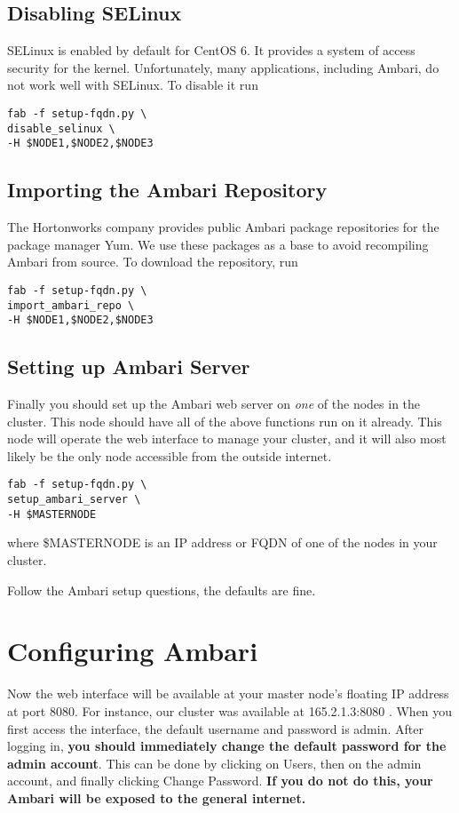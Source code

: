 \documentclass[9pt,twocolumn,twoside]{idsi}
\begin{document}
\subsection{Disabling SELinux}
SELinux is enabled by default for CentOS 6. It provides a system of access security for the kernel. Unfortunately, many applications, including Ambari, do not work well with SELinux. To disable it run

\begin{verbatim}
fab -f setup-fqdn.py \
disable_selinux \
-H $NODE1,$NODE2,$NODE3
\end{verbatim}

\subsection{Importing the Ambari Repository}
The Hortonworks company provides public Ambari package repositories for the package manager Yum. We use these packages as a base to avoid recompiling Ambari from source. To download the repository, run

\begin{verbatim}
fab -f setup-fqdn.py \
import_ambari_repo \
-H $NODE1,$NODE2,$NODE3
\end{verbatim}

\subsection{Setting up Ambari Server}

Finally you should set up the Ambari web server on \emph{one} of the nodes in the cluster. This node should have all of the above functions run on it already. This node will operate the web interface to manage your cluster, and it will also most likely be the only node accessible from the outside internet.

\begin{verbatim}
fab -f setup-fqdn.py \
setup_ambari_server \
-H $MASTERNODE
\end{verbatim}

where \$MASTERNODE is an IP address or FQDN of one of the nodes in your cluster.

Follow the Ambari setup questions, the defaults are fine.

\section{Configuring Ambari}
Now the web interface will be available at your master node's floating IP address at port 8080. For instance, our cluster was available at 165.2.1.3:8080 . When you first access the interface, the default username and password is admin. After logging in, \textbf{you should immediately change the default password for the admin account}. This can be done by clicking on Users, then on the admin account, and finally clicking Change Password. \textbf{If you do not do this, your Ambari will be exposed to the general internet.}
\end{document}
